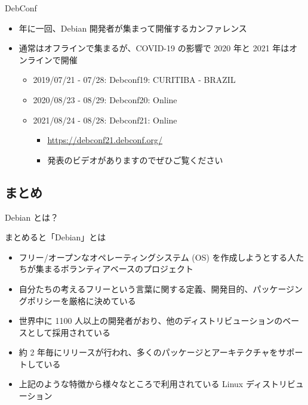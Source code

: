 \begin{frame}{DebConf}%
  
\begin{itemize}
\item 年に一回、Debian 開発者が集まって開催するカンファレンス
\item 通常はオフラインで集まるが、COVID-19 の影響で 2020 年と 2021 年はオンラインで開催
  \begin{itemize}
  \item 2019/07/21 - 07/28: Debconf19: CURITIBA - BRAZIL
  \item 2020/08/23 - 08/29: Debconf20: Online
  \item 2021/08/24 - 08/28: Debconf21: Online
    \begin{itemize}
    \item \url{https://debconf21.debconf.org/}
    \item 発表のビデオがありますのでぜひご覧ください
    \end{itemize}
  \end{itemize}
\end{itemize}


\end{frame}

\subsection{まとめ}

\begin{frame}{Debian とは？}
  
まとめると「Debian」とは

\begin{itemize}
  \item フリー/オープンなオペレーティングシステム (OS) を作成しようとする人たちが集まるボランティアベースのプロジェクト
  \item 自分たちの考えるフリーという言葉に関する定義、開発目的、パッケージングポリシーを厳格に決めている
  \item 世界中に 1100 人以上の開発者がおり、他のディストリビューションのベースとして採用されている
  \item 約 2 年毎にリリースが行われ、多くのパッケージとアーキテクチャをサポートしている
  \item 上記のような特徴から様々なところで利用されている Linux ディストリビューション
\end{itemize}

\end{frame}

